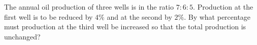 The annual oil production of three wells is in the ratio $7:6:5$. Production at the first well is to be reduced by $4\%$ and at the second by $2\%$. By what percentage must production at the third well be increased so that the total production is unchanged?
